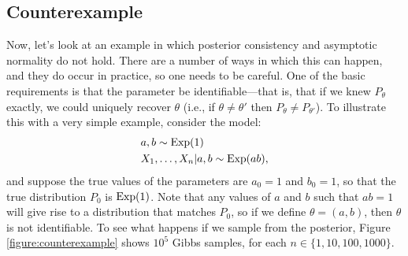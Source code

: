 \documentclass[12pt]{article}
\begin{document}


\subsection{Counterexample}

Now, let's look at an example in which posterior consistency and asymptotic normality do not hold. There are a number of ways in which this can happen, and they do occur in practice, so one needs to be careful. One of the basic requirements is that the parameter be identifiable---that is, that if we knew $P_\theta$ exactly, we could uniquely recover $\theta$  (i.e., if $\theta \neq \theta'$ then $P_\theta \neq P_{\theta'}$). To illustrate this with a very simple example, consider the model:
\begin{align*}
& a,b\sim \operatorname*{Exp}(1)\\
& X_1,\ldots,X_n | a,b\sim \operatorname*{Exp}(a b),
\end{align*}
and suppose the true values of the parameters are $a_0 = 1$ and $b_0 = 1$, so that the true distribution $P_0$ is $\operatorname*{Exp}(1)$. Note that any values of $a$ and $b$ such that $a b = 1$ will give rise to a distribution that matches $P_0$, so if we define $\theta = (a,b)$, then $\theta$ is not identifiable. To see what happens if we sample from the posterior, Figure \ref{figure:counterexample} shows $10^5$ Gibbs samples, for each $n\in \{1,10,100,1000 \}$.
\end{document}
